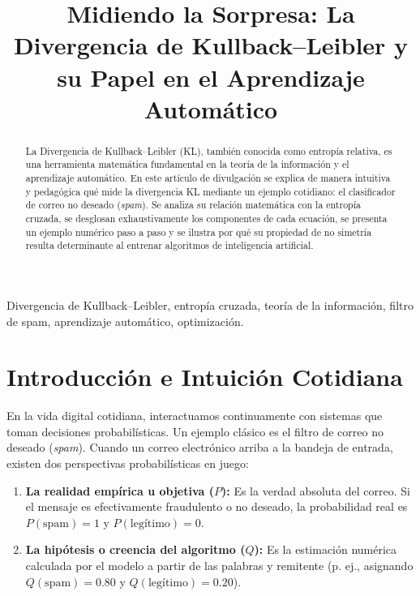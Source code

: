 \documentclass[conference]{IEEEtran}
\begin{document}
	
	\title{Midiendo la Sorpresa: La Divergencia de Kullback--Leibler y su Papel en el Aprendizaje Automático}
	
	\author{
	}
	
	\maketitle
	
	\begin{abstract}
		La Divergencia de Kullback--Leibler (KL), también conocida como entropía relativa, es una herramienta matemática fundamental en la teoría de la información y el aprendizaje automático. En este artículo de divulgación se explica de manera intuitiva y pedagógica qué mide la divergencia KL mediante un ejemplo cotidiano: el clasificador de correo no deseado (\textit{spam}). Se analiza su relación matemática con la entropía cruzada, se desglosan exhaustivamente los componentes de cada ecuación, se presenta un ejemplo numérico paso a paso y se ilustra por qué su propiedad de no simetría resulta determinante al entrenar algoritmos de inteligencia artificial.
	\end{abstract}
	
	\begin{IEEEkeywords}
		Divergencia de Kullback--Leibler, entropía cruzada, teoría de la información, filtro de spam, aprendizaje automático, optimización.
	\end{IEEEkeywords}
	
	\section{Introducción e Intuición Cotidiana}
	En la vida digital cotidiana, interactuamos continuamente con sistemas que toman decisiones probabilísticas. Un ejemplo clásico es el filtro de correo no deseado (\textit{spam}). Cuando un correo electrónico arriba a la bandeja de entrada, existen dos perspectivas probabilísticas en juego:
	\begin{enumerate}
		\item \textbf{La realidad empírica u objetiva ($P$):} Es la verdad absoluta del correo. Si el mensaje es efectivamente fraudulento o no deseado, la probabilidad real es $P(\text{spam}) = 1$ y $P(\text{legítimo}) = 0$.
		\item \textbf{La hipótesis o creencia del algoritmo ($Q$):} Es la estimación numérica calculada por el modelo a partir de las palabras y remitente (p. ej., asignando $Q(\text{spam}) = 0.80$ y $Q(\text{legítimo}) = 0.20$).
	\end{enumerate}
	
\end{document}
